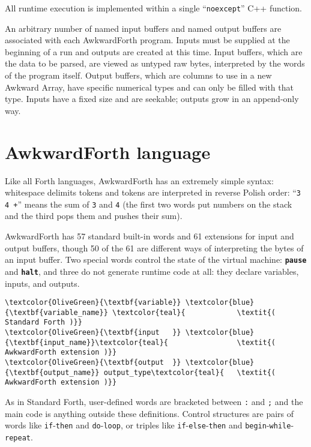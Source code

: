 \documentclass{webofc}
\begin{document}
All runtime execution is implemented within a single ``\texttt{noexcept}'' C++ function.

An arbitrary number of named input buffers and named output buffers are associated with each AwkwardForth program. Inputs must be supplied at the beginning of a run and outputs are created at this time. Input buffers, which are the data to be parsed, are viewed as untyped raw bytes, interpreted by the words of the program itself. Output buffers, which are columns to use in a new Awkward Array, have specific numerical types and can only be filled with that type. Inputs have a fixed size and are seekable; outputs grow in an append-only way.

\section{AwkwardForth language}

Like all Forth languages, AwkwardForth has an extremely simple syntax: whitespace delimits tokens and tokens are interpreted in reverse Polish order: ``\texttt{3 4 +}'' means the sum of \texttt{3} and \texttt{4} (the first two words put numbers on the stack and the third pops them and pushes their sum).

AwkwardForth has 57 standard built-in words and 61 extensions for input and output buffers, though 50 of the 61 are different ways of interpreting the bytes of an input buffer. Two special words control the state of the virtual machine: \textcolor{OliveGreen}{\tt\textbf{pause}} and \textcolor{OliveGreen}{\tt\textbf{halt}}, and three do not generate runtime code at all: they declare variables, inputs, and outputs.

\begin{Verbatim}[commandchars=\\\{\}]
\textcolor{OliveGreen}{\textbf{variable}} \textcolor{blue}{\textbf{variable_name}} \textcolor{teal}{            \textit{( Standard Forth )}}
\textcolor{OliveGreen}{\textbf{input   }} \textcolor{blue}{\textbf{input_name}}\textcolor{teal}{                \textit{( AwkwardForth extension )}}
\textcolor{OliveGreen}{\textbf{output  }} \textcolor{blue}{\textbf{output_name}} output_type\textcolor{teal}{   \textit{( AwkwardForth extension )}}
\end{Verbatim}

As in Standard Forth, user-defined words are bracketed between \texttt{:} and \texttt{;} and the main code is anything outside these definitions. Control structures are pairs of words like \texttt{if}-\texttt{then} and \texttt{do}-\texttt{loop}, or triples like \texttt{if}-\texttt{else}-\texttt{then} and \texttt{begin}-\texttt{while}-\texttt{repeat}.
\end{document}

